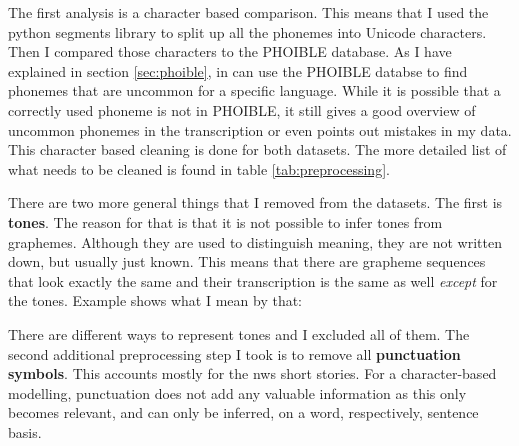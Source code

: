 The first analysis is a character based comparison. This means that I used the python segments library to split up all the phonemes into Unicode characters. Then I compared those characters to the PHOIBLE database. As I have explained in section \ref{sec:phoible}, in can use the PHOIBLE databse to find phonemes that are uncommon for a specific language. While it is possible that a correctly used phoneme is not in PHOIBLE, it still gives a good overview of uncommon phonemes in the transcription or even points out mistakes in my data. This character based cleaning is done for both datasets. The more detailed list of what needs to be cleaned is found in table \ref{tab:preprocessing}.

There are two more general things that I removed from the datasets. The first is \textbf{tones}. The reason for that is that it is not possible to infer tones from graphemes. Although they are used to distinguish meaning, they are not written down, but usually just known. This means that there are grapheme sequences that look exactly the same and their transcription is the same as well \textit{except} for the tones. Example shows what I mean by that:

\begin{covsubexamples}
\item
\item
\end{covsubexamples}

There are different ways to represent tones and I excluded all of them. The second additional preprocessing step I took is to remove all \textbf{punctuation symbols}. This accounts mostly for the \ac{nws} short stories. For a character-based modelling, punctuation does not add any valuable information as this only becomes relevant, and can only be inferred, on a word, respectively, sentence basis.    

